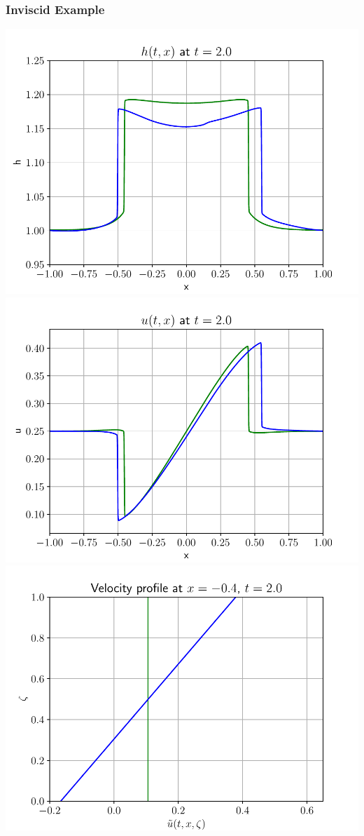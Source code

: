 \documentclass[10pt]{beamer}
\begin{document}
      \begin{frame}
        \frametitle{Inviscid Example}
        \centering
        \includegraphics[scale=0.3]{Figures/h_10.pdf}
        \includegraphics[scale=0.3]{Figures/u_10.pdf}
        \includegraphics[scale=0.3]{Figures/velocity_profile_-0_4.pdf}

\end{frame}
\end{document}
